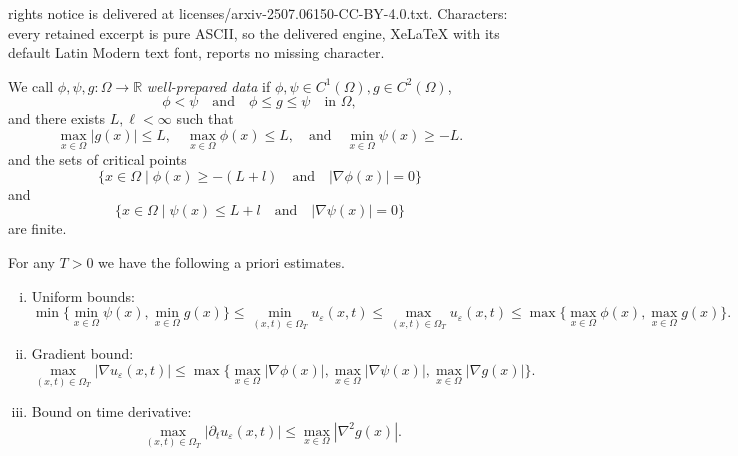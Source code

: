 \documentclass[10pt,a4paper]{amsart}
\def\R{{\mathbb{R}}}
\begin{document}
rights notice is delivered at licenses/arxiv-2507.06150-CC-BY-4.0.txt. Characters: every retained excerpt is pure ASCII, so the delivered engine, XeLaTeX with its default Latin Modern text font, reports no missing character.
\begin{definition}\label{def:well-prepared}
    We call $\phi,\psi,g\colon \Omega \to \R$ \emph{well-prepared data} if $\phi,\psi \in C^1 (\Omega), g \in C^2 (\Omega)$,
    \[
        \phi<\psi 
        \quad \text{and} \quad
        \phi \leq g \leq \psi \quad \text{in }\Omega,
    \]
    and there exists $L, \ell<\infty$ such that
    \begin{equation}\label{lem3.4:assumption1}
        \max_{x \in \Omega} |g(x)| \leq L,
        \quad 
        \max_{x \in \Omega} \phi (x) \leq L,
        \quad 
        \text{and} 
        \quad
        \min_{x \in \Omega} \psi (x) \geq -L.
    \end{equation}
    and the sets of critical points
    \[
        \{ x \in \Omega \mid \phi (x) \geq - (L+l) \quad \text{and} \quad
    |\nabla \phi (x)|=0 \}
    \]
    and
    \[
    \{ x \in \Omega \mid \psi (x) \leq L+l \quad \text{and} \quad
    |\nabla \psi (x)|=0 \}
    \]
    are finite.
\end{definition}

\begin{proposition}\label{prop:mp}
For any $T>0$ we have the following a priori estimates.
\begin{enumerate}[(i)]
    \item \label{item:mp1}
    Uniform bounds:
    \[
    \min \{  
    \min_{x \in \Omega} \psi (x), \min_{x \in \Omega } g (x) \}
    \leq
    \min _{(x,t) \in \Omega_T } u_\varepsilon (x,t) \leq 
    \max _{(x,t) \in \Omega_T } u_\varepsilon (x,t)
    \leq \max \{  
    \max_{x \in \Omega} \phi (x), \max_{x \in \Omega } g (x) \}.
    \]
    \item\label{item:mp2}
    Gradient bound:
    \[
    \max _{(x,t) \in \Omega_T } 
    | \nabla u_\varepsilon (x,t)|
    \leq \max \{  
    \max_{x \in \Omega} |\nabla \phi (x)|,
    \max_{x \in \Omega} |\nabla \psi (x)|,    
    \max_{x \in \Omega } |\nabla g (x)| \}.
    \]
    \item\label{item:mp3}
    Bound on time derivative:
    \[
    \max _{(x,t) \in \Omega_T } 
    | \partial_t u_\varepsilon (x,t)|
    \leq
    \max_{x \in \Omega } |\nabla ^2 g (x)|.
    \]
\end{enumerate}

\end{proposition}
\end{document}
